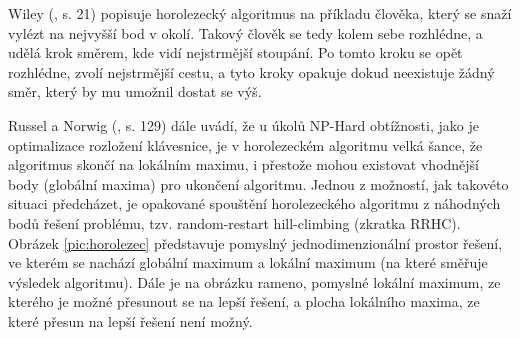 \documentclass[a4paper, twoside, 12pt, czech]{article}
\begin{document}
Wiley (\cite{evolutionaryOptimizationAlgos}, s. 21) popisuje horolezecký 
algoritmus na příkladu člověka, který se snaží vylézt na nejvyšší bod v okolí. 
Takový člověk se tedy kolem sebe rozhléd\-ne, a udělá krok směrem, kde vidí 
nejstrmější stoupání. Po tomto kroku se opět rozhlédne, zvolí nejstrmější cestu, 
a tyto kroky opakuje dokud neexistuje žádný směr, který by mu umožnil dostat se 
výš.

Russel a Norwig (\cite{aiModernApproach}, s. 129) dále uvádí, že u úkolů NP-Hard 
obtížnosti, jako je optimalizace rozložení klávesnice, je v horolezeckém algoritmu 
velká šance, že algoritmus skončí na lokálním maximu, i přestože mohou existovat 
vhodnější body (globální maxima) pro ukončení algoritmu. Jednou z možností, jak 
takovéto situaci předcházet, je opakované spouštění horolezeckého algoritmu z 
náhodných bodů řešení problému, tzv. random-restart hill-climbing (zkratka RRHC).
Obrázek \ref{pic:horolezec} představuje pomyslný jednodimenzionální prostor řešení, 
ve kterém se nachází globální maximum a lokální maximum (na které směřuje výsle\-dek 
algoritmu). Dále je na obrázku rameno, pomyslné lokální maximum, ze kterého je možné
přesunout se na lepší řešení, a plocha lokálního maxima, ze které přesun na lepší 
řešení není možný.
\end{document}

